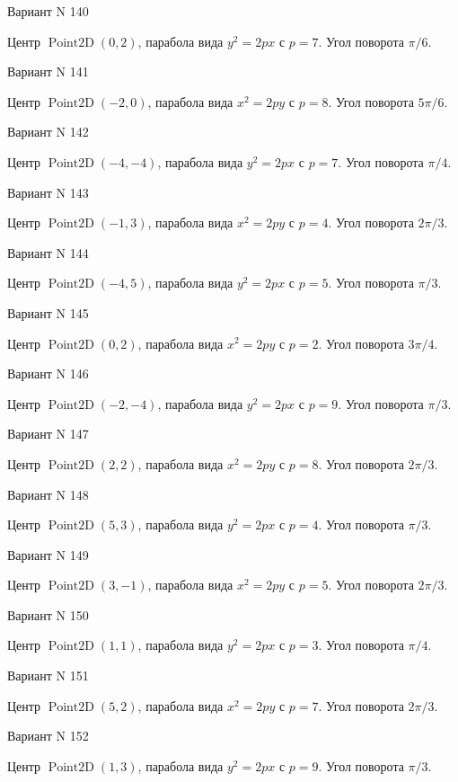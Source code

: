 \documentclass[11pt]{report}
\begin{document}
Вариант N 140

Центр $\operatorname{Point2D}\left(0, 2\right)$, парабола вида $y^{2} = 2px$ с $p = 7$. Угол поворота $\pi / 6$.

Вариант N 141

Центр $\operatorname{Point2D}\left(-2, 0\right)$, парабола вида $x^{2} = 2py$ с $p = 8$. Угол поворота $5 \pi / 6$.

Вариант N 142

Центр $\operatorname{Point2D}\left(-4, -4\right)$, парабола вида $y^{2} = 2px$ с $p = 7$. Угол поворота $\pi / 4$.

Вариант N 143

Центр $\operatorname{Point2D}\left(-1, 3\right)$, парабола вида $x^{2} = 2py$ с $p = 4$. Угол поворота $2 \pi / 3$.

Вариант N 144

Центр $\operatorname{Point2D}\left(-4, 5\right)$, парабола вида $y^{2} = 2px$ с $p = 5$. Угол поворота $\pi / 3$.

Вариант N 145

Центр $\operatorname{Point2D}\left(0, 2\right)$, парабола вида $x^{2} = 2py$ с $p = 2$. Угол поворота $3 \pi / 4$.

Вариант N 146

Центр $\operatorname{Point2D}\left(-2, -4\right)$, парабола вида $y^{2} = 2px$ с $p = 9$. Угол поворота $\pi / 3$.

Вариант N 147

Центр $\operatorname{Point2D}\left(2, 2\right)$, парабола вида $x^{2} = 2py$ с $p = 8$. Угол поворота $2 \pi / 3$.

Вариант N 148

Центр $\operatorname{Point2D}\left(5, 3\right)$, парабола вида $y^{2} = 2px$ с $p = 4$. Угол поворота $\pi / 3$.

Вариант N 149

Центр $\operatorname{Point2D}\left(3, -1\right)$, парабола вида $x^{2} = 2py$ с $p = 5$. Угол поворота $2 \pi / 3$.

Вариант N 150

Центр $\operatorname{Point2D}\left(1, 1\right)$, парабола вида $y^{2} = 2px$ с $p = 3$. Угол поворота $\pi / 4$.

Вариант N 151

Центр $\operatorname{Point2D}\left(5, 2\right)$, парабола вида $x^{2} = 2py$ с $p = 7$. Угол поворота $2 \pi / 3$.

Вариант N 152

Центр $\operatorname{Point2D}\left(1, 3\right)$, парабола вида $y^{2} = 2px$ с $p = 9$. Угол поворота $\pi / 3$.
\end{document}
